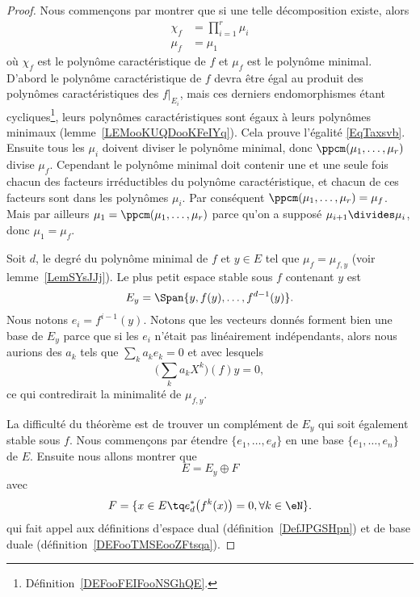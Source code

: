 \begin{proof}
	Nous commençons par montrer que si une telle décomposition existe, alors
	\begin{subequations}    \label{subEqzcGouz}
		\begin{align}
			\chi_f & =\prod_{i=1}^r\mu_i   \label{EqTaxsvb} \\
			\mu_f  & =\mu_1
		\end{align}
	\end{subequations}
	où \( \chi_f\) est le polynôme caractéristique de \( f\) et \( \mu_f\) est le polynôme minimal. D'abord le polynôme caractéristique de \( f\) devra être égal au produit des polynômes caractéristiques des \( f|_{E_i}\), mais ces derniers endomorphismes étant cycliques\footnote{Définition~\ref{DEFooFEIFooNSGhQE}.}, leurs polynômes caractéristiques sont égaux à leurs polynômes minimaux (lemme~\ref{LEMooKUQDooKFeIYq}). Cela prouve l'égalité \eqref{EqTaxsvb}. Ensuite tous les \( \mu_i\) doivent diviser le polynôme minimal, donc \( \ppcm(\mu_1,\ldots, \mu_r)\) divise \(\mu_f\). Cependant le polynôme minimal doit contenir une et une seule fois chacun des facteurs irréductibles du polynôme caractéristique, et chacun de ces facteurs sont dans les polynômes \( \mu_i\). Par conséquent \( \ppcm(\mu_1,\ldots, \mu_r)=\mu_f\). Mais par ailleurs \( \mu_1=\ppcm(\mu_1,\ldots, \mu_r)\) parce qu'on a supposé \( \mu_{i+1}\divides \mu_i\), donc \( \mu_1=\mu_f\).

	Soit \( d\), le degré du polynôme minimal de \( f\) et \( y\in E\) tel que \( \mu_f=\mu_{f,y}\) (voir lemme~\ref{LemSYsJJj}). Le plus petit espace stable sous \( f\) contenant \( y\) est
	\begin{equation}
		E_y=\Span\{ y,f(y),\ldots, f^{d-1}(y) \}.
	\end{equation}
	Nous notons \( e_i=f^{i-1}(y)\). Notons que les vecteurs donnés forment bien une base de \( E_y\) parce que si les \( e_i\) n'était pas linéairement indépendants, alors nous aurions des \( a_k\) tels que \( \sum_ka_ke_k=0\) et avec lesquels
	\begin{equation}
		\big( \sum_ka_kX^k \big)(f)y=0,
	\end{equation}
	ce qui contredirait la minimalité de \( \mu_{f,y}\).

	La difficulté du théorème est de trouver un complément de \( E_y\) qui soit également stable sous \( f\). Nous commençons par étendre \( \{ e_1,\ldots, e_d \}\) en une base \( \{ e_1,\ldots, e_n \}\) de \( E\). Ensuite nous allons montrer que
	\begin{equation}
		E=E_y\oplus F
	\end{equation}
	avec
	\begin{equation}
		F=\{ x\in E\tq  e^*_d\big( f^k(x) \big)=0, \forall k\in \eN \}.
	\end{equation}
	qui fait appel aux définitions d'espace dual (définition~\ref{DefJPGSHpn}) et de base duale (définition~\ref{DEFooTMSEooZFtsqa}).


\end{proof}
